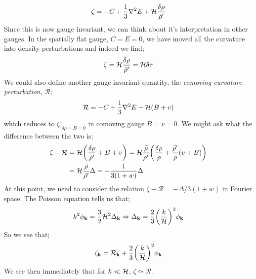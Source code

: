 \begin{equation}
\zeta = -C + \frac{1}{3}\nabla^2 E + \mathcal{H}\frac{\delta \rho}{\bar{\rho}^{\prime}}
\end{equation}
Since this is now gauge invariant, we can think about it's interpretation in other gauges. In the spatially flat gauge, $C = E = 0$, we have moved all the curvature into density perturbations and indeed we find;
\begin{equation*}
\zeta = \mathcal{H} \frac{\delta \rho}{\bar{\rho}^{\prime}} = \mathcal{H} \delta \tau
\end{equation*}
We could also define another gauge invariant quantity, the \emph{comoving curvature perturbation}, $\mathcal{R}$;
\begin{equation}
\mathcal{R} = - C + \frac{1}{3}\nabla^2 E - \mathcal{H}(B + v)
\end{equation}
which reduces to $\left.\zeta\right|_{\delta\rho = B = 0}$ in comoving gauge $B = v = 0$. We might ask what the difference between the two is;
\begin{align*}
\zeta - \mathcal{R} &= \hamilt\left(\frac{\delta \rho}{\bar{\rho}\pr} + B + v\right) = \hamilt\frac{\bar{\rho}}{\bar{\rho}\pr}\left(\frac{\delta \rho}{\bar{\rho}} + \frac{\bar{\rho}\pr}{\bar{\rho}}(v + B)\right) \\
&= \hamilt\frac{\bar{\rho}}{\bar{\rho}\pr}\Delta = -\frac{1}{3(1 + w)}\Delta
\end{align*}
At this point, we need to consider the relation $\zeta - \mathcal{R} = -\Delta/3(1 + w)$ in Fourier space. The Poisson equation tells us that;
\begin{equation*}
k^2 \phi_{\vec{k}} = \frac{3}{2}\hamilt^2 \Delta_{\vec{k}} \Rightarrow \Delta_{\vec{k}} = \frac{2}{3}\left(\frac{k}{\hamilt}\right)^2 \phi_{\vec{k}}
\end{equation*}
So we see that;
\begin{equation}
\zeta_{\vec{k}} = \mathcal{R}_{\vec{k}} + \frac{2}{3}\left(\frac{k}{\hamilt}\right)^2 \phi_{\vec{k}}
\end{equation}
We see then immediately that for $k \ll \mathcal{H}$, $\zeta \simeq \mathcal{R}$.
